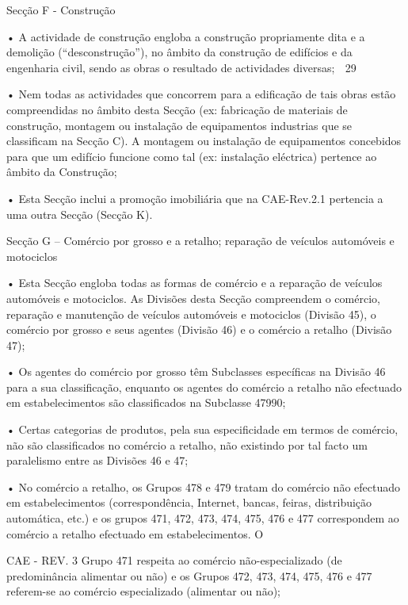      Secção F - Construção

             • A actividade de construção engloba a construção propriamente dita e a demolição (“desconstrução”),
               no âmbito da construção de edifícios e da engenharia civil, sendo as obras o resultado de
               actividades diversas;
                                                                                                                  29


       • Nem todas as actividades que concorrem para a edificação de tais obras estão compreendidas no
         âmbito desta Secção (ex: fabricação de materiais de construção, montagem ou instalação de
         equipamentos industrias que se classificam na Secção C). A montagem ou instalação de
         equipamentos concebidos para que um edifício funcione como tal (ex: instalação eléctrica) pertence
         ao âmbito da Construção;

       • Esta Secção inclui a promoção imobiliária que na CAE-Rev.2.1 pertencia a uma outra Secção
         (Secção K).

Secção G – Comércio por grosso e a retalho; reparação de veículos automóveis e motociclos

       • Esta Secção engloba todas as formas de comércio e a reparação de veículos automóveis e
         motociclos. As Divisões desta Secção compreendem o comércio, reparação e manutenção de
         veículos automóveis e motociclos (Divisão 45), o comércio por grosso e seus agentes (Divisão
         46) e o comércio a retalho (Divisão 47);

       • Os agentes do comércio por grosso têm Subclasses específicas na Divisão 46 para a sua
         classificação, enquanto os agentes do comércio a retalho não efectuado em estabelecimentos
         são classificados na Subclasse 47990;

       • Certas categorias de produtos, pela sua especificidade em termos de comércio, não são
         classificados no comércio a retalho, não existindo por tal facto um paralelismo entre as Divisões
         46 e 47;

       • No comércio a retalho, os Grupos 478 e 479 tratam do comércio não efectuado em estabelecimentos
         (correspondência, Internet, bancas, feiras, distribuição automática, etc.) e os grupos 471, 472,
         473, 474, 475, 476 e 477 correspondem ao comércio a retalho efectuado em estabelecimentos. O




                                                                                                                  CAE - REV. 3
         Grupo 471 respeita ao comércio não-especializado (de predominância alimentar ou não) e os
         Grupos 472, 473, 474, 475, 476 e 477 referem-se ao comércio especializado (alimentar ou não);

